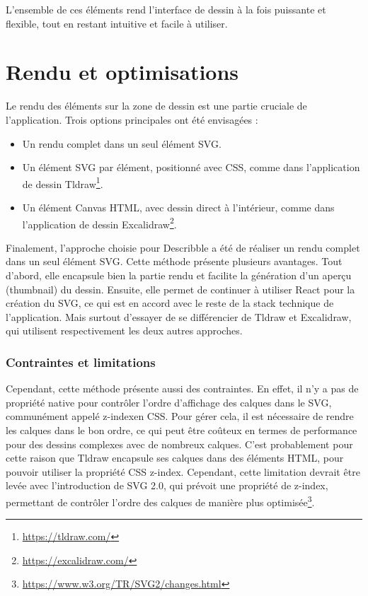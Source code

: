 L'ensemble de ces éléments rend l'interface de dessin à la fois puissante et flexible, tout en restant intuitive et facile à utiliser.

\section{Rendu et optimisations}

Le rendu des éléments sur la zone de dessin est une partie cruciale de l'application. Trois options principales ont été envisagées :

\begin{itemize}
    \item Un rendu complet dans un seul élément SVG.
    \item Un élément SVG par élément, positionné avec CSS, comme dans l'application de dessin Tldraw\footnote{\url{https://tldraw.com/}}.
    \item Un élément Canvas HTML, avec dessin direct à l'intérieur, comme dans l'application de dessin Excalidraw\footnote{\url{https://excalidraw.com/}}.
\end{itemize}

Finalement, l'approche choisie pour \gls{Describble} a été de réaliser un rendu complet dans un seul élément SVG. Cette méthode présente plusieurs avantages. Tout d'abord, elle encapsule bien la partie rendu et facilite la génération d'un aperçu (thumbnail) du dessin. Ensuite, elle permet de continuer à utiliser React pour la création du SVG, ce qui est en accord avec le reste de la stack technique de l'application. Mais surtout d'essayer de se différencier de Tldraw et Excalidraw, qui utilisent respectivement les deux autres approches.

\subsubsection{Contraintes et limitations}

Cependant, cette méthode présente aussi des contraintes. En effet, il n'y a pas de propriété native pour contrôler l'ordre d'affichage des calques dans le SVG, communément appelé \guillemotleft z-index\guillemotright en CSS. Pour gérer cela, il est nécessaire de rendre les calques dans le bon ordre, ce qui peut être coûteux en termes de performance pour des dessins complexes avec de nombreux calques. C'est probablement pour cette raison que Tldraw encapsule ses calques dans des éléments HTML, pour pouvoir utiliser la propriété CSS \guillemotleft z-index\guillemotright. Cependant, cette limitation devrait être levée avec l'introduction de SVG 2.0, qui prévoit une propriété de z-index, permettant de contrôler l'ordre des calques de manière plus optimisée\footnote{\url{https://www.w3.org/TR/SVG2/changes.html}}.

